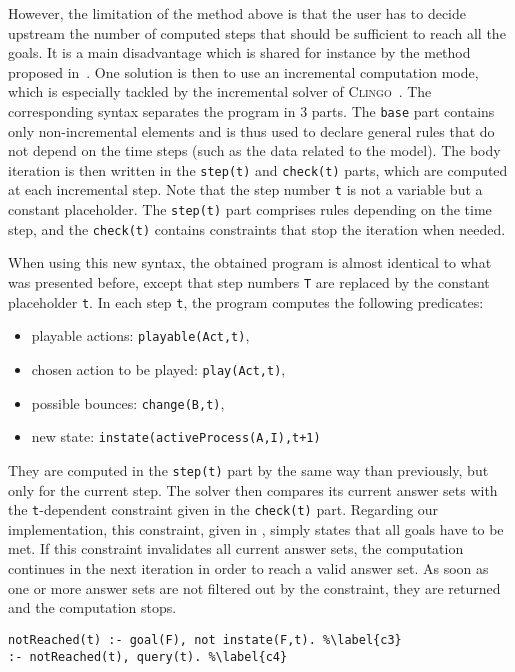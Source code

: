However, the limitation of the method above is that the user has to decide upstream
the number of computed steps that should be sufficient to reach all the goals.
It is a main disadvantage which is shared for instance by the method proposed in~\cite{roccaasp}. %
One solution is then to use an incremental computation mode,
which is especially tackled by the incremental solver of \textsc{Clingo}~\cite{gebser2010incremental}.
The corresponding syntax separates the program in 3 parts.
The \texttt{base} part contains only non-incremental elements
and is thus used to declare general rules
that do not depend on the time steps (such as the data related to the model).
The body iteration is then written in the
\texttt{step(t)} and \texttt{check(t)} parts,
which are computed at each incremental step.
Note that the step number \texttt{t} is not a variable but a constant placeholder.
The \texttt{step(t)} part comprises rules depending on the time step,
and the \texttt{check(t)} contains constraints that stop the iteration when needed.

When using this new syntax, the obtained program is almost identical
to what was presented before,
except that step numbers \texttt{T}
are replaced by the constant placeholder \texttt{t}.
In each step \texttt{t}, the program computes the following predicates:
\begin{itemize}\renewcommand{\labelitemi}{--}
  \item playable actions: \texttt{playable(Act,t)},
  \item chosen action to be played: \texttt{play(Act,t)},
  \item possible bounces: \texttt{change(B,t)},
  \item new state: \texttt{instate(activeProcess(A,I),t+1)}
\end{itemize}
They are computed in the \texttt{step(t)} part by
the same way than previously,
but only for the current step.
The solver then compares its current answer sets with
the \texttt{t}-dependent constraint given in the \texttt{check(t)} part.
Regarding our implementation, this constraint, given in ,
simply states that all goals have to be met.
If this constraint invalidates all current answer sets,
the computation continues in the next iteration in order to reach a valid answer set.
As soon as one or more answer sets are not filtered out by the constraint,
they are returned and the computation stops.
\begin{lstlisting}
notReached(t) :- goal(F), not instate(F,t). %\label{c3}
:- notReached(t), query(t). %\label{c4}
\end{lstlisting}


